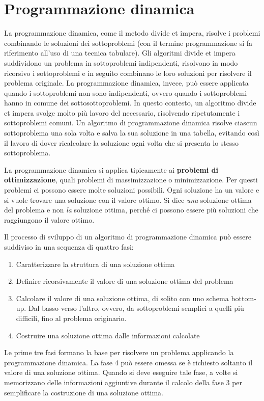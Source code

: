 \documentclass[10pt, a4paper]{report}
\begin{document}
\chapter{Programmazione dinamica}
La programmazione dinamica, come il metodo divide et impera, risolve i problemi combinando le soluzioni dei sottoproblemi (con il termine programmazione si fa riferimento all'uso di una tecnica tabulare). Gli algoritmi divide et impera suddividono un problema in sottoproblemi indipendenti, risolvono in modo ricorsivo i sottoproblemi e in seguito combinano le loro soluzioni per risolvere il problema originale. La programmazione dinamica, invece, può essere applicata quando i sottoproblemi non sono indipendenti, ovvero quando i sottoproblemi hanno in comune dei sottosottoproblemi. In questo contesto, un algoritmo divide et impera svolge molto più lavoro del necessario, risolvendo ripetutamente i sottoproblemi comuni. Un algoritmo di programmazione dinamica risolve ciascun sottoproblema una sola volta e salva la sua soluzione in una tabella, evitando così il lavoro di dover ricalcolare la soluzione ogni volta che si presenta lo stesso sottoproblema.

La programmazione dinamica si applica tipicamente ai \textbf{problemi di ottimizzazione}, quali problemi di massimizzazione o minimizzazione. Per questi problemi ci possono essere molte soluzioni possibili. Ogni soluzione ha un valore e si vuole trovare una soluzione con il valore ottimo. Si dice \textsl{una} soluzione ottima del problema e non \textsl{la} soluzione ottima, perché ci possono essere più soluzioni che raggiungono il valore ottimo.

Il processo di sviluppo di un algoritmo di programmazione dinamica può essere suddiviso in una sequenza di quattro fasi:
\begin{enumerate}
\item Caratterizzare la struttura di una soluzione ottima
\item Definire ricorsivamente il valore di una soluzione ottima del problema
\item Calcolare il valore di una soluzione ottima, di solito con uno schema bottom-up. Dal basso verso l'altro, ovvero, da sottoproblemi semplici a quelli più difficili, fino al problema originario.
\item Costruire una soluzione ottima dalle informazioni calcolate
\end{enumerate}
Le prime tre fasi formano la base per risolvere un problema applicando la programmazione dinamica. La fase 4 può essere omessa se è richiesto soltanto il valore di una soluzione ottima. Quando si deve eseguire tale fase, a volte si memorizzano delle informazioni aggiuntive durante il calcolo della fase 3 per semplificare la costruzione di una soluzione ottima. 
\end{document}
